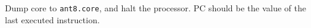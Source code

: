 


Dump core to {\tt ant8.core}, 
and halt the processor. PC should be the value of the last executed instruction.



